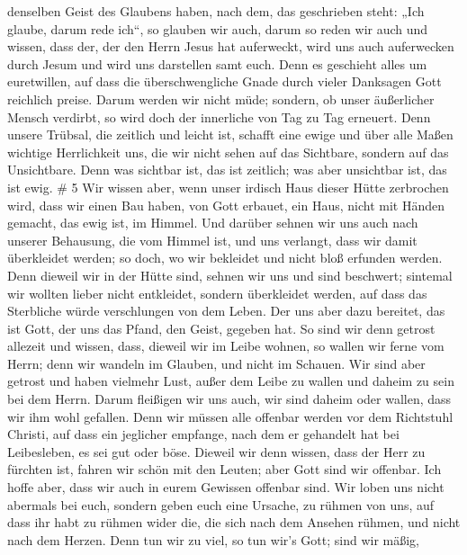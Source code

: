 denselben Geist des Glaubens haben, nach dem, das geschrieben steht:
„Ich glaube, darum rede ich``, so glauben wir auch, darum so reden wir
auch  und wissen, dass der, der den Herrn Jesus hat
auferweckt, wird uns auch auferwecken durch Jesum und wird uns
darstellen samt euch.  Denn es geschieht alles um
euretwillen, auf dass die überschwengliche Gnade durch vieler Danksagen
Gott reichlich preise.  Darum werden wir nicht müde;
sondern, ob unser äußerlicher Mensch verdirbt, so wird doch der
innerliche von Tag zu Tag erneuert.  Denn unsere Trübsal,
die zeitlich und leicht ist, schafft eine ewige und über alle Maßen
wichtige Herrlichkeit  uns, die wir nicht sehen auf das
Sichtbare, sondern auf das Unsichtbare. Denn was sichtbar ist, das ist
zeitlich; was aber unsichtbar ist, das ist ewig. \# 5  Wir
wissen aber, wenn unser irdisch Haus dieser Hütte zerbrochen wird, dass
wir einen Bau haben, von Gott erbauet, ein Haus, nicht mit Händen
gemacht, das ewig ist, im Himmel.  Und darüber sehnen wir
uns auch nach unserer Behausung, die vom Himmel ist, und uns verlangt,
dass wir damit überkleidet werden;  so doch, wo wir
bekleidet und nicht bloß erfunden werden.  Denn dieweil wir
in der Hütte sind, sehnen wir uns und sind beschwert; sintemal wir
wollten lieber nicht entkleidet, sondern überkleidet werden, auf dass
das Sterbliche würde verschlungen von dem Leben.  Der uns
aber dazu bereitet, das ist Gott, der uns das Pfand, den Geist, gegeben
hat.  So sind wir denn getrost allezeit und wissen, dass,
dieweil wir im Leibe wohnen, so wallen wir ferne vom Herrn; 
denn wir wandeln im Glauben, und nicht im Schauen.  Wir sind
aber getrost und haben vielmehr Lust, außer dem Leibe zu wallen und
daheim zu sein bei dem Herrn.  Darum fleißigen wir uns auch,
wir sind daheim oder wallen, dass wir ihm wohl gefallen. 
Denn wir müssen alle offenbar werden vor dem Richtstuhl Christi, auf
dass ein jeglicher empfange, nach dem er gehandelt hat bei Leibesleben,
es sei gut oder böse.  Dieweil wir denn wissen, dass der
Herr zu fürchten ist, fahren wir schön mit den Leuten; aber Gott sind
wir offenbar. Ich hoffe aber, dass wir auch in eurem Gewissen offenbar
sind.  Wir loben uns nicht abermals bei euch, sondern geben
euch eine Ursache, zu rühmen von uns, auf dass ihr habt zu rühmen wider
die, die sich nach dem Ansehen rühmen, und nicht nach dem Herzen.
 Denn tun wir zu viel, so tun wir's Gott; sind wir mäßig,
